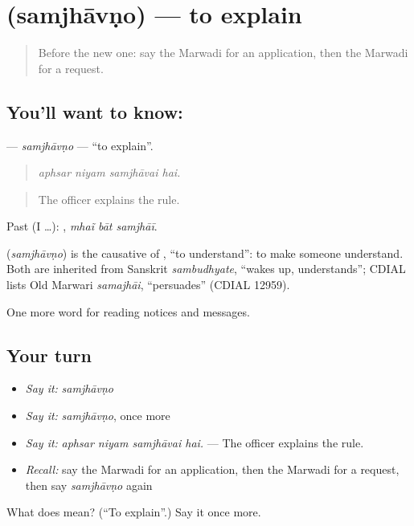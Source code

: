 \section[\texorpdfstring{\mw{समझावणो} (samjhāvṇo)}{समझावणो (samjhāvṇo)}]{ (samjhāvṇo) — to explain}

\label{lesson:MW-C198-samjhavno}



\begin{quote}
Before the new one: say the Marwadi for an application, then the Marwadi for a request.
\end{quote}

\subsection*{You'll want to know: }
\textbf{} — \emph{samjhāvṇo} — \textquotedblleft{}to explain\textquotedblright{}.

\begin{quote}
   
\end{quote}

\begin{quote}
\emph{aphsar niyam samjhāvai hai.}
\end{quote}

\begin{quote}
The officer explains the rule.
\end{quote}

Past (I …):   , \emph{mhaĩ bāt samjhāī}.

\begin{cousinweb}
\textbf{} (\emph{samjhāvṇo}) is the causative of \textbf{}, \textquotedblleft{}to understand\textquotedblright{}: to make someone understand. Both are inherited from Sanskrit \emph{sambudhyate}, \textquotedblleft{}wakes up, understands\textquotedblright{}; CDIAL lists Old Marwari \emph{samajhāi}, \textquotedblleft{}persuades\textquotedblright{} (CDIAL 12959).
\end{cousinweb}

\begin{grammarlens}[title={What you've built}]
One more word for reading notices and messages.
\end{grammarlens}

\subsection*{Your turn}
\begin{itemize}
\raggedright
  \item \emph{Say it:} \emph{samjhāvṇo}
  \item \emph{Say it:} \emph{samjhāvṇo}, once more
  \item \emph{Say it:} \emph{aphsar niyam samjhāvai hai.} — The officer explains the rule.
  \item \emph{Recall:} say the Marwadi for an application, then the Marwadi for a request, then say \emph{samjhāvṇo} again
\end{itemize}

\begin{tcolorbox}[breakable,colback=teal!4,colframe=teal!35!black,title={Before you move on}]
What does  mean? (\textquotedblleft{}To explain\textquotedblright{}.) Say it once more.
\end{tcolorbox}
